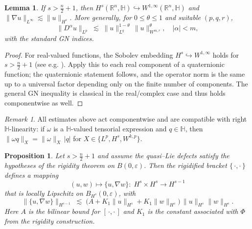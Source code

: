 \documentclass[10pt]{amsart}
\numberwithin{equation}{section}
\newtheorem{prop}[theorem]{Proposition}
\newtheorem{lem}[theorem]{Lemma}
\theoremstyle{remark}
\newtheorem{rmk}[theorem]{Remark}
\theoremstyle{definition}
\begin{document}
\begin{lem}\label{lem:GN}
If $s>\frac{n}{2}+1$, then $H^{s}(\mathbb{R}^n,\mathbb{H})\hookrightarrow W^{1,\infty}(\mathbb{R}^n,\mathbb{H})$ and
$\|\nabla u\|_{L^\infty}\lesssim \|u\|_{H^{s}}$.
More generally, for $0\le \theta\le 1$ and suitable $(p,q,r)$,
\[
\|D^{\alpha} u\|_{L^{p}}
\;\lesssim\;
\|u\|_{L^{q}}^{1-\theta}\,\|u\|_{W^{m,r}}^{\theta},
\quad |\alpha|<m,
\]
with the standard GN indices.
\end{lem}

\begin{proof}
For real-valued functions, the Sobolev embedding $H^{s}\hookrightarrow W^{1,\infty}$ holds for $s>\frac{n}{2}+1$
(see e.g. \cite[Ch.~7]{Adams2003}). Apply this to each real component of a quaternionic function; the quaternionic statement follows,
and the operator norm is the same up to a universal factor depending only on the finite number of components.
The general GN inequality is classical in the real/complex case and thus holds componentwise as well.
\end{proof}

\begin{rmk}
All estimates above act componentwise and are compatible with right $\mathbb{H}$-linearity:
if $\omega$ is a $\mathbb{H}$-valued tensorial expression and $q\in\mathbb{H}$, then
$\|\omega q\|_{X}=\|\omega\|_{X}\,|q|$ for $X\in\{L^{p},H^{s},W^{k,p}\}$.
\end{rmk}

\begin{prop}\label{prop:Lipschitz-nonlinearity}
Let $s>\frac{n}{2}+1$ and assume the quasi--Lie defects satisfy the hypotheses of the rigidity theorem on $B(0,\varepsilon)$.
Then the rigidified bracket $\{\,\cdot,\cdot\,\}$ defines a mapping
\[
(u,w)\mapsto \{u,\nabla w\}:\; H^{s}\times H^{s}\to H^{s-1}
\]
that is locally Lipschitz on $B_{H^{s}}(0,\varepsilon)$, with
\[
\|\{u,\nabla w\}\|_{H^{s-1}}
\;\lesssim\;
\big(A+K_1\|u\|_{H^{s}}+K_1\|w\|_{H^{s}}\big)\,\|u\|_{H^{s}}\|w\|_{H^{s}}.
\]
Here $A$ is the bilinear bound for $[\,\cdot,\cdot\,]$ and $K_1$ is the constant associated with $\Phi$ from the rigidity construction.
\end{prop}
\end{document}
